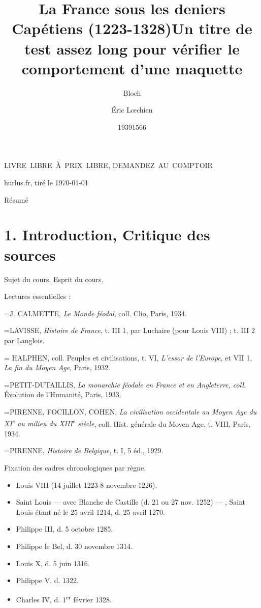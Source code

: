 \documentclass[french,twoside]{book} %
\title{La France sous les deniers Capétiens (1223-1328)}
\date{1939}
\author{Bloch}
\author{Éric Lœchien}
\title{Un titre de test assez long pour vérifier le comportement d’une maquette}
\date{1566}
\makeatletter
\newif\ifdev
\newcommand{\elabstract}{Résumé\par}
\let\eltitle\@title
\let\elauthor\@author
\let\eldate\@date
\renewcommand{\LettrineFontHook}{\color{rubric}}
\newcommand{\initialiv}[2]{%
  \let\oldLFH\LettrineFontHook
  \IfSubStr{Q}{#1}{
    \lettrine[lines=4, lhang=0.2, loversize=-0.1, lraise=0.2]{\smash{#1}}{#2}
  }{\IfSubStr{É}{#1}{
    \lettrine[lines=4, lhang=0.2, loversize=-0, lraise=0]{\smash{#1}}{#2}
  }{\IfSubStr{ÀÂ}{#1}{
    \lettrine[lines=4, lhang=0.2, loversize=-0, lraise=0, slope=0.6em]{\smash{#1}}{#2}
  }{\IfSubStr{A}{#1}{
    \lettrine[lines=4, lhang=0.2, loversize=0.2, slope=0.6em]{\smash{#1}}{#2}
  }{\IfSubStr{V}{#1}{
    \lettrine[lines=4, lhang=0.2, loversize=0.2, slope=-0.5em]{\smash{#1}}{#2}
  }{
    \lettrine[lines=4, lhang=0.2, loversize=0.2]{\smash{#1}}{#2}
  }}}}}
  \let\LettrineFontHook\oldLFH
}
\newcommand{\biblitem}[1]{{\noindent\hangindent=\parindent   #1\par}}
\newcommand\chapteropen{} %
\newcommand\chaptercont{} %
\renewcommand{\LettrineFontHook}{\bfseries\color{rubric}}
\renewcommand\chapteropen{} %
\renewcommand\chaptercont{} %
\newcommand\chapo{{%
  \vspace*{-3em}
  \centering %
  {\Large\addfontfeature{LetterSpace=25}\bfseries{\elauthor}}\par
  \smallskip
  {\large\eldate}\par
  \bigskip
  {\Large\selectfont\emph{\eltitle}}\par
  \bigskip
  {\hline\par}
  \bigskip
  {\Large LIVRE LIBRE À PRIX LIBRE, DEMANDEZ AU COMPTOIR\par}
  \centerline{\small\color{rubric} {hurlus.fr, tiré le \today}}\par
  \bigskip
}}
\makeatother
\begin{document}
\pagestyle{fancy}
\thispagestyle{empty}


\ifaiv
  \twocolumn[\chapo]
\else
  \chapo
\fi


\elabstract
\bigskip

\makeatletter{}\makeatother %

\ifdev %

\fontname\font — \textsc{Les règles du jeu}\par
(\hyperref[utopie]{\underline{Lien}})\par
\noindent \initialiv{A}{lors là}\blindtext\par
\noindent \initialiv{À}{ la bonheur des dames}\blindtext\par
\noindent \initialiv{É}{tonnez-le}\blindtext\par
\noindent \initialiv{Q}{ualitativement}\blindtext\par
\noindent \initialiv{V}{aloriser}\blindtext\par
\Blindtext
\phantomsection
\label{utopie}
\Blinddocument
\fi


\chapteropen
\chapter[1. Introduction, Critique des sources]{\textsc{1. }Introduction, Critique des sources}
\label{c01}

\chaptercont
\noindent Sujet du cours. Esprit du cours.\par
Lectures essentielles :\par
\biblitem{J. CALMETTE, {\itshape Le Monde féodal}, coll. Clio, Paris, 1934.}
\biblitem{LAVISSE, {\itshape Histoire de France}, t. III 1, par Luchaire (pour Louis VIII) ; t. III 2 par Langlois.}
\biblitem{ HALPHEN, coll. Peuples et civilisations, t. VI, {\itshape L’essor de l’Europe}, et VII 1, {\itshape La fin du Moyen Age}, Paris, 1932.}
\biblitem{PETIT-DUTAILLIS, {\itshape La monarchie féodale en France et en Angleterre, coll.} Évolution de l’Humanité, Paris, 1933.}
\biblitem{PIRENNE, FOCILLON, COHEN, {\itshape La civilisation occidentale au Moyen Age du XI\textsuperscript{e} au milieu du XIII\textsuperscript{e} siècle}, coll. Hist. générale du Moyen Age, t. VIII, Paris, 1934.}
\biblitem{PIRENNE, {\itshape Histoire de Belgique}, t. I, 5 éd., 1929.}
\noindent Fixation des cadres chronologiques par règne.\par

\begin{itemize}[itemsep=0pt,]
\item Louis VIII (14 juillet 1223-8 novembre 1226).
\item Saint Louis — avec Blanche de Castille (d. 21 ou 27 nov. 1252) — , Saint Louis étant né le 25 avril 1214, d. 25 avril 1270.
\item Philippe III, d. 5 octobre 1285.
\item Philippe le Bel, d. 30 novembre 1314.
\item Louis X, d. 5 juin 1316.
\item Philippe V, d. 1322.
\item Charles IV, d. 1\textsuperscript{er} février 1328.
\end{itemize}
\end{document}
